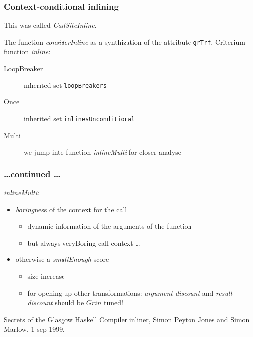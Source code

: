 \documentclass{beamer}
\newcommand{\grin}{$Grin$ }
\begin{document}
\begin{frame}[fragile]
\frametitle{Context-conditional inlining}
This was called \emph{CallSiteInline}.

The function \emph{considerInline} as a synthization of the attribute \texttt{grTrf}.
Criterium function \emph{inline}:
\begin{description}
\item[LoopBreaker] inherited set \texttt{loopBreakers}
\item[Once] inherited set \texttt{inlinesUnconditional}
\item[Multi] we jump into function \emph{inlineMulti} for closer analyse 
\end{description}
\end{frame}



\begin{frame}[fragile]
\frametitle{\ldots continued \ldots}
\emph{inlineMulti}: 
\begin{itemize}
\item \emph{boring}ness of the context for the call
\begin{itemize}
\item dynamic information of the arguments of the function
\item but always veryBoring call context \ldots
\end{itemize}
\item otherwise a \emph{smallEnough} score
\begin{itemize}
\item size increase
\item for opening up other transformations: \emph{argument discount} and \emph{result discount}
should be \grin tuned!
\end{itemize}
\end{itemize}
\end{frame}


\begin{frame}[fragile]
\begin{thebibliography}{Secrets}
 Secrets of the Glasgow Haskell Compiler inliner, Simon Peyton Jones and Simon Marlow, 1 sep 1999.
\end{thebibliography}
\end{frame}
\end{document}
